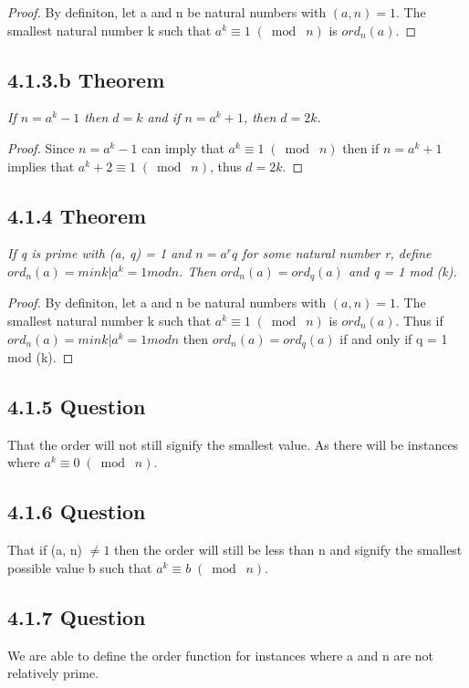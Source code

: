 \documentclass{article}
\begin{document}
\begin{proof}
By definiton, let a and n be natural numbers with $(a,n) = 1$. The smallest natural number k such that $a^k \equiv 1 \;(\bmod\; n)$ is $ord_n(a)$.
\end{proof}

\subsection*{4.1.3.b Theorem} 
\quad \textit{If $n = a^k − 1$ then $d = k$ and if $n = a^k + 1$, then $d = 2k$.}

\begin{proof}
Since $n = a^k − 1$ can imply that $a^{k} \equiv 1 \;(\bmod\; n)$ then if $n = a^k + 1$ implies that $a^{k} + 2 \equiv 1 \;(\bmod\; n)$, thus $d = 2k$.
\end{proof}

\subsection*{4.1.4 Theorem} 
\quad \textit{If q is prime with (a, q) = 1 and $n = a^rq$ for some natural number r, define $ord_n(a) = min{k | a^k = 1 mod n}$. Then $ord_n(a) = ord_q(a)$ and q = 1 mod (k).}

\begin{proof}
By definiton, let a and n be natural numbers with $(a,n) = 1$. The smallest natural number k such that $a^k \equiv 1 \;(\bmod\; n)$ is $ord_n(a)$. Thus if $ord_n(a) = min{k | a^k = 1 mod n}$ then $ord_n(a) = ord_q(a)$ if and only if q = 1 mod (k).
\end{proof}

\subsection*{4.1.5 Question}
That the order will not still signify the smallest value. As there will be instances where $a^k \equiv 0 \;(\bmod\; n)$.

\subsection*{4.1.6 Question}
That if (a, n) $\neq 1$ then the order will still be less than n and signify the smallest possible value b such that $a^k \equiv b \;(\bmod\; n)$.

\subsection*{4.1.7 Question}
We are able to define the order function for instances where a and n are not relatively prime.
\end{document}
